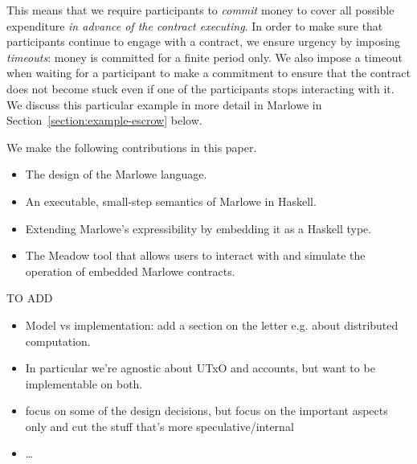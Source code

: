\documentclass[runningheads]{llncs}
\begin{document}
This means that we require participants to \emph{commit} money to cover all possible expenditure \emph{in advance of the 
contract executing}. In order to make sure that participants continue to engage with a contract, we ensure urgency by 
imposing \emph{timeouts}: money is committed for a finite period only. We also impose a timeout when  waiting for a participant to make a 
commitment to ensure that the contract does not become stuck even if one of the 
participants stops interacting with it. We discuss this particular example in more detail in Marlowe in Section~\ref{section:example-escrow} below.

We make the following contributions in this paper.
\begin{itemize}
\item
The design of the Marlowe language.
\item
An executable, small-step semantics of Marlowe in Haskell.
\item 
Extending Marlowe's expressibility by embedding it as a Haskell  type.
\item
The Meadow tool that allows users to interact with and simulate the operation of embedded Marlowe contracts. 
\end{itemize}

TO ADD
\begin{itemize}
\item 
Model vs implementation: add a section on the letter e.g. about distributed computation.
\item
In particular we're agnostic about UTxO and accounts, but want to be implementable on both.
\item
focus on some of the design decisions, but focus on the important aspects only and cut the stuff that's  more speculative/internal
\item  
\ldots
\end{itemize}


%
 
\end{document}
